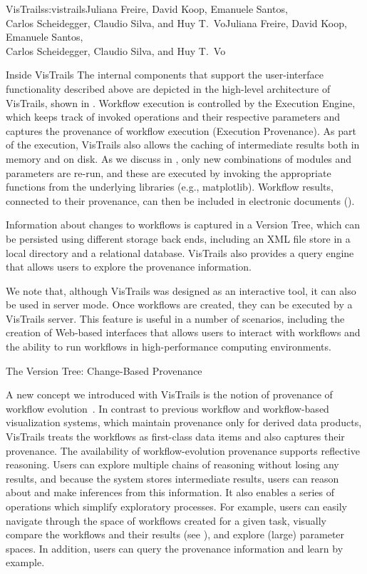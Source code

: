 \begin{aosachaptertoc}{VisTrails}{s:vistrails}{Juliana Freire, David Koop, Emanuele Santos, \\ Carlos Scheidegger, Claudio Silva, and Huy T.\ Vo}{Juliana Freire, David Koop, Emanuele Santos, \\ \hspace*{0.9cm} Carlos Scheidegger, Claudio Silva, and Huy T.\ Vo}
\begin{aosasect1}{Inside VisTrails}
The internal components that support the user-interface functionality
described above are depicted in the high-level architecture of
VisTrails, shown in .  Workflow
execution is controlled by the Execution Engine, which keeps track of
invoked operations and their respective parameters and captures the
provenance of workflow execution (Execution Provenance). As part of
the execution, VisTrails also allows the caching of intermediate
results both in memory and on disk. As we discuss in
, only new combinations of
modules and parameters are re-run, and these are executed by invoking
the appropriate functions from the underlying libraries (e.g.,
matplotlib).  Workflow results, connected to their provenance, can
then be included in electronic documents
().

Information about changes to workflows is captured in a Version Tree,
which can be persisted using different storage back ends, including an
XML file store in a local directory and a relational database.
VisTrails also provides a query engine that allows users to explore
the provenance information.

We note that, although VisTrails was designed as an interactive tool,
it can also be used in server mode.  Once workflows are created, they
can be executed by a VisTrails server. This feature is useful in a
number of scenarios, including the creation of Web-based interfaces
that allows users to interact with workflows and the ability to run
workflows in high-performance computing environments.

\begin{aosasect2}{The Version Tree: Change-Based Provenance}


A new concept we introduced with VisTrails is the notion of provenance
of workflow evolution~\cite{bib:freire:vistrails}. In contrast to previous workflow and 
workflow-based visualization systems, which maintain provenance only
for derived data products, VisTrails treats the workflows as
first-class data items and also captures their provenance. The
availability of workflow-evolution provenance supports reflective
reasoning. Users can explore multiple chains of reasoning without
losing any results, and because the system stores intermediate
results, users can reason about and make inferences from this
information.  It also enables a series of operations which simplify
exploratory processes. For example, users can easily navigate through
the space of workflows created for a given task, visually compare the
workflows and their results (see
), and explore (large) parameter
spaces. In addition, users can query the provenance information and
learn by example.


\end{aosasect2}
\end{aosasect1}
\end{aosachaptertoc}
